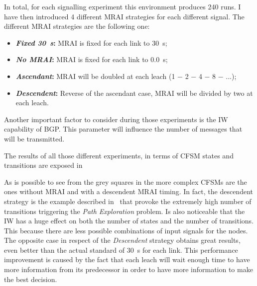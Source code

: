 In total, for each signalling experiment this environment produces \num{240} runs.
I have then introduced \num{4} different \ac{MRAI} strategies for each different
signal.
The different \ac{MRAI} strategies are the following one:
\begin{itemize}
	\item \textbf{\textit{Fixed \SI{30}{\second}}:} \ac{MRAI} is fixed for each link to \SI{30}{\second};
	\item \textbf{\textit{No \ac{MRAI}}:} \ac{MRAI} is fixed for each link to \SI{0.0}{\second};
	\item \textbf{\textit{Ascendant}:} \ac{MRAI} will be doubled at each leach (1 − 2 − 4 − 8 − ...);
	\item \textbf{\textit{Descendent}:} Reverse of the ascendant case, \ac{MRAI} will be divided by two at each leach.
\end{itemize}

Another important factor to consider during those experiments is the \ac{IW}
capability of \ac{BGP}.
This parameter will influence the number of messages
that will be transmitted.

The results of all those different experiments, in terms of \ac{CFSM} states and
transitions are exposed in 

\begin{table}[h]
	
	\caption{Fabrikant \ac{CFSM}s results, $|S|$ is the dimension of the states set
		$|T|$ is the dimension of the transitions set, The worst results for each
		category are colored in gray, the topology contains \num{3} rings, as
		, the environment is described in in
		}
	\label{tbl:fabrikant_cfsm}
\end{table}

As is possible to see from the grey squares in  the more
complex \ac{CFSM}s are the ones without \ac{MRAI} and with a descendent \ac{MRAI}
timing.
In fact, the descendent strategy is the example described in~\cite{fabrikant2011there}
that provoke the extremely high number of transitions triggering the \textit{Path Exploration}
problem.
Is also noticeable that the \ac{IW} has a huge effect on both the number
of states and the number of transitions.
This because there are less possible combinations of input signals for the nodes.
The opposite case in respect of the \textit{Descendent} strategy obtains
great results, even better than the actual standard of \SI{30}{\second} for
each link.
This performance improvement is caused by the fact that each leach will wait
enough time to have more information from its predecessor in order to have
more information to make the best decision.

